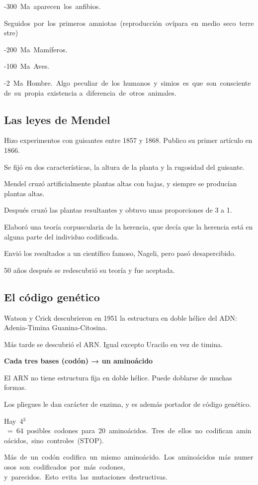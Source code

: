 \documentclass[12pt, twoside, openright]{report} %
\begin{document}
-300 Ma aparecen los anfibios.

Seguidos por los primeros amniotas (reproducción ovípara en medio seco terrestre)

-200 Ma Mamíferos.

-100 Ma Aves.

-2 Ma Hombre. Algo peculiar de los humanos y simios es que son consciente de su propia existencia a diferencia de otros animales.

\subsection{Las leyes de Mendel}
Hizo experimentos con guisantes entre 1857 y 1868. Publico su primer artículo en 1866.

Se fijó en dos características, la altura de la planta y la rugosidad del guisante.

Mendel cruzó artificialmente plantas altas con bajas, y siempre se producían plantas altas.

Después cruzó las plantas resultantes y obtuvo unas proporciones de 3 a 1.

Elaboró una teoría corpuscularia de la herencia, que decía que la herencia está en alguna parte del individuo codificada.

Envió los resultados a un científico famoso, Nageli, pero pasó desapercibido.

50 años después se redescubrió su teoría y fue aceptada.

\subsection{El código genético}
Watson y Crick descubrieron en 1951 la estructura en doble hélice del ADN: Adenia-Timina Guanina-Citosina.

Más tarde se descubrió el ARN. Igual excepto Uracilo en vez de timina.

\textbf{Cada tres bases (codón) → un aminoácido}

El ARN no tiene estructura fija en doble hélice. Puede doblarse de muchas formas.

Los pliegues le dan carácter de enzima, y es además portador de código genético.

Hay 4$^3$ = 64 posibles codones para 20 aminoácidos. Tres de ellos no codifican aminoácidos, sino controles (STOP).

Más de un codón codifica un mismo aminoácido. Los aminoácidos más numerosos son codificados por más codones, y parecidos. Esto evita las mutaciones destructivas.
\end{document}
